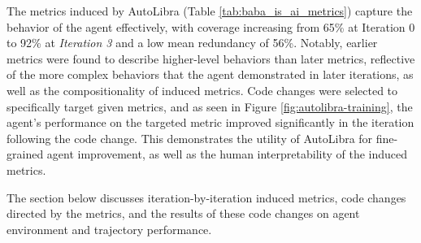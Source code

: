 The metrics induced by AutoLibra (Table \ref{tab:baba_is_ai_metrics}) capture
the behavior of the agent effectively, with coverage increasing from 65\% at
Iteration 0 to 92\% at \emph{Iteration 3} and a low mean redundancy of 56\%.
Notably, earlier metrics were found to describe higher-level behaviors than later
metrics, reflective of the more complex behaviors that the agent demonstrated in
later iterations, as well as the compositionality of induced metrics. Code
changes were selected to specifically target given metrics, and as seen in Figure
\ref{fig:autolibra-training}, the agent's performance on the targeted metric
improved significantly in the iteration following the code change. This demonstrates
the utility of AutoLibra for fine-grained agent improvement, as well as the
human interpretability of the induced metrics.

The section below discusses iteration-by-iteration induced metrics, code changes
directed by the metrics, and the results of these code changes on agent
environment and trajectory performance.

